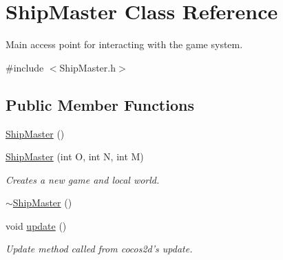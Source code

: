 \hypertarget{classShipMaster}{\section{Ship\-Master Class Reference}
\label{classShipMaster}
}


Main access point for interacting with the game system.  




{\ttfamily \#include $<$Ship\-Master.\-h$>$}

\subsection*{Public Member Functions}
\begin{DoxyCompactItemize}
\item 
\hyperlink{classShipMaster_a607690189ed059378e939c9500909c9a}{Ship\-Master} ()
\item 
\hyperlink{classShipMaster_aad717c55623a33a03bab50381e0386e1}{Ship\-Master} (int O, int N, int M)
\begin{DoxyCompactList}\small\item\em Creates a new game and local world. \end{DoxyCompactList}\item 
\hyperlink{classShipMaster_a1000b9a0ab83b8984a3d1e72f9db621e}{$\sim$\-Ship\-Master} ()
\item 
void \hyperlink{classShipMaster_a2e1b2737d8c4ab6ff0c64b046d437718}{update} ()
\begin{DoxyCompactList}\small\item\em Update method called from cocos2d's update. \end{DoxyCompactList}\end{DoxyCompactItemize}
